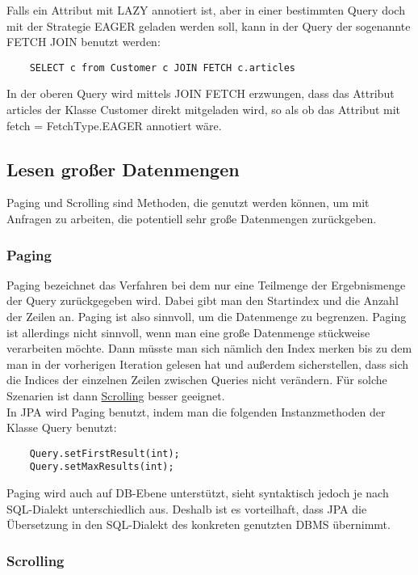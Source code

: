 Falls ein Attribut mit LAZY annotiert ist, aber in einer bestimmten Query doch mit der Strategie EAGER geladen werden soll, kann in der Query der sogenannte FETCH JOIN benutzt werden:

\begin{lstlisting}
    SELECT c from Customer c JOIN FETCH c.articles
\end{lstlisting}

In der oberen Query wird mittels JOIN FETCH erzwungen, dass das Attribut articles der Klasse Customer direkt mitgeladen wird, so als ob das Attribut mit fetch = FetchType.EAGER annotiert wäre.

\subsection{Lesen großer Datenmengen}

Paging und Scrolling sind Methoden, die genutzt werden können, um mit Anfragen zu arbeiten, die potentiell sehr große Datenmengen zurückgeben.

\subsubsection{Paging}
Paging bezeichnet das Verfahren bei dem nur eine Teilmenge der Ergebnismenge der Query zurückgegeben wird. Dabei gibt man den Startindex und die Anzahl der Zeilen an. Paging ist also sinnvoll, um die Datenmenge zu begrenzen. Paging ist allerdings nicht sinnvoll, wenn man eine große Datenmenge stückweise verarbeiten möchte. Dann müsste man sich nämlich den Index merken bis zu dem man in der vorherigen Iteration gelesen hat und außerdem sicherstellen, dass sich die Indices der einzelnen Zeilen zwischen Queries nicht verändern. Für solche Szenarien ist dann \hyperref[sec:scrolling]{Scrolling} besser geeignet.\\
In JPA wird Paging benutzt, indem man die folgenden Instanzmethoden der Klasse Query benutzt:

\begin{lstlisting}
    Query.setFirstResult(int);
    Query.setMaxResults(int);
\end{lstlisting}

Paging wird auch auf DB-Ebene unterstützt, sieht syntaktisch jedoch je nach SQL-Dialekt unterschiedlich aus. Deshalb ist es vorteilhaft, dass JPA die Übersetzung in den SQL-Dialekt des konkreten genutzten DBMS übernimmt.

\subsubsection{Scrolling}
\label{sec:scrolling}


